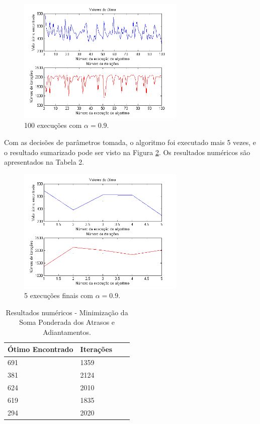 \documentclass[conference]{IEEEtran}
\begin{document}
	\begin{figure}[h]
		\centering
		\includegraphics[width=8cm]{img/mult-result-spa-3.png}
		\caption{100 execuções com $\alpha = 0.9$.}
		\label{fig:mult-result-spa-3}
	\end{figure}
	\newpage
Com as decisões de parâmetros tomada, o algoritmo foi executado mais 5 vezes, e o resultado sumarizado pode ser visto na Figura \ref{fig:mult-result-spa-4}. Os resultados numéricos são apresentados na Tabela 2.

	\begin{figure}[h]
		\centering
		\includegraphics[width=8cm]{img/mult-result-spa-4.png}
		\caption{5 execuções finais com $\alpha = 0.9$.}
		\label{fig:mult-result-spa-4}
	\end{figure}
	
	\begin{table}[h]
		\centering
		\begin{tabular}{ | l | l | l | l |}
			\hline
			Ótimo Encontrado & Iterações \\ \hline
			691 & 1359 \\ \hline
			381 & 2124 \\ \hline
			624 & 2010 \\ \hline
			619 & 1835 \\ \hline
			294 & 2020 \\ \hline
		\end{tabular}
		\label{table:result2}
		\caption{Resultados numéricos - Minimização da Soma Ponderada dos Atrasos e Adiantamentos.}
	\end{table}
\end{document}
